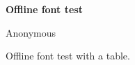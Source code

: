 \documentclass[11pt]{article}
\begin{document}
\selectfont
\begin{center}
{\bfseries Offline font test\par}
{Anonymous\par}
\end{center}
Offline font test with a table.
\end{document}
